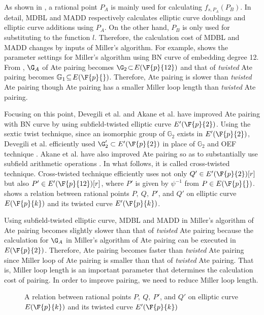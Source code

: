 As shown in , a rational point $P_A$ is mainly used for calculating $f_{s,P_A}(P_B)$.
In detail, MDBL and MADD respectively calculates elliptic curve doublings and elliptic curve additions using $P_A$.
On the other hand, $P_B$ is only used for substituting to the function $l$.
Therefore, the calculation cost of MDBL and MADD changes by inputs of Miller's algorithm.
For example,  shows the parameter settings for Miller's algorithm using BN curve of embedding degree 12.
From , $\G_A$ of Ate pairing becomes $\G_2\!\subset\! E(\F{p}{12})$ and that of {\it twisted} Ate pairing becomes $\mathbb{G}_1 \!\subseteq \!E(\F{p}{})$.
Therefore, Ate pairing is slower than {\it twisted} Ate pairing though Ate pairing has a smaller Miller loop length than {\it twisted} Ate pairing.

Focusing on this point, Devegili et al. \cite{Devegili} and Akane et al.\cite{CSS2} have improved Ate pairing with BN curve by using subfield-twisted elliptic curve $E'(\F{p}{2})$.
Using the sextic twist technique, since an isomorphic group of $\mathbb{G}_2$ exists in $E'(\F{p}{2})$, Devegili et al. efficiently used $\G_2'\subset E'(\F{p}{2})$ in place of $\mathbb{G}_2$ and OEF technique \cite{OEF}.  Akane et al. have also improved Ate pairing so as to substantially use subfield arithmetic operations \cite{CSS2}. 
In what follows, it is called cross-twisted technique. Cross-twisted technique \cite{CSS2} efficiently uses not only $Q'\in E'(\F{p}{2})[r]$ but also $P'\in E'(\F{p}{12})[r]$, where $P'$ is given by $\psi^{-1}$ from $P\in E(\F{p}{})$.  shows a relation between rational points $P,\ Q,\ P'$, and $Q'$ on elliptic curve $E(\F{p}{k})$ and its twisted curve $E'(\F{p}{k})$. 

Using subfield-twisted elliptic curve, MDBL and MADD in Miller's algorithm of Ate pairing becomes slightly slower than that of {\it twisted} Ate pairing because the calculation for $\G_A$ in Miller's algorithm of Ate pairing can be executed in $E(\F{p}{2})$.
Therefore, Ate pairing becomes faster than {\it twisted} Ate pairing since Miller loop of Ate pairing is smaller than that of {\it twisted} Ate pairing.
That is, Miller loop length is an important parameter that determines the calculation cost of pairing.
In order to improve pairing, we need to reduce Miller loop length.

\begin{figure}[ht]
\begin{center}\label{fig:twist_point_relation}

\end{center}
\caption{A relation between rational points $P,\ Q,\ P'$, and $Q'$ on elliptic curve $E(\F{p}{k})$ and its twisted curve $E'(\F{p}{k})$}
\end{figure}
 

